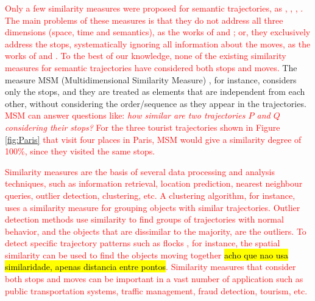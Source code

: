 \documentclass[12pt]{article}
\begin{document}
\textcolor{red}{Only a few  similarity measures were proposed for semantic trajectories, as \cite{Kang:2009:SMT:1529282.1529580}, \cite{Liu:2012:SMM:2442968.2442971}, \cite{Ying:2010:MUS:1867699.1867703}, \cite{Furtado:TGIS12156}. The main problems of these measures is that they do not address all three dimensions (space, time and semantics), as the works of \cite{Kang:2009:SMT:1529282.1529580} and \cite{Liu:2012:SMM:2442968.2442971}; or, 
they exclusively address the stops, systematically ignoring all information about the moves, as the works of \cite{Ying:2010:MUS:1867699.1867703} and \cite{Furtado:TGIS12156}. To the best of our knowledge, none of the existing similarity measures for semantic trajectories have considered both stops and moves.} The measure MSM (Multidimensional Similarity Measure) \citep{Furtado:TGIS12156}, for instance, considers only the stops, and they are treated as elements that are independent from each other, without considering the order/sequence as they appear in the trajectories. \textcolor{red}{ MSM can answer questions like: \emph{how similar are two trajectories $P$ and $Q$ considering their stops?} For the three tourist trajectories shown in Figure \ref{fig:Paris} that visit four places in Paris, MSM would give a similarity degree of 100\%, since they visited the same stops.}

 

\textcolor{red}{Similarity measures are the basis of several data processing and analysis techniques, such as information retrieval, location prediction, nearest neighbour queries, outlier detection, clustering, etc. A clustering algorithm, for instance, uses a similarity measure for grouping objects with similar trajectories. Outlier detection methods use similarity to find groups of trajectories with normal behavior, and the objects that are dissimilar to the majority, are the outliers. To detect specific trajectory patterns such as flocks \cite{Laube2005}, for instance, the spatial similarity can be used to find the objects moving together\hl{ acho que nao usa similaridade, apenas distancia entre pontos}. Similarity measures that consider both stops and moves can be important in a vast number of application such as public transportation systems, traffic management, fraud detection, tourism, etc. }
\end{document}
